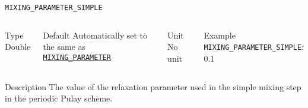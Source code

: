 \begin{frame}[allowframebreaks]{\texttt{MIXING\_PARAMETER\_SIMPLE}} \label{MIXING_PARAMETER_SIMPLE}
\vspace*{-12pt}
\begin{columns}
\begin{block}{Type}
Double
\end{block}

\begin{block}{Default}
Automatically set to the same as \hyperlink{MIXING_PARAMETER}{\texttt{MIXING\_PARAMETER}}
\end{block}

\begin{block}{Unit}
No unit
\end{block}

\begin{block}{Example}
\texttt{MIXING\_PARAMETER\_SIMPLE}: 0.1
\end{block}
\end{columns}

\begin{block}{Description}
The value of the relaxation parameter used in the simple mixing step in the periodic Pulay scheme.
\end{block}

\end{frame}


